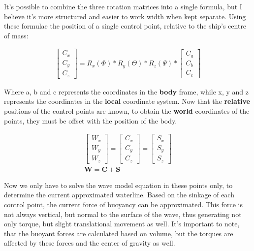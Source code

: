It's possible to combine the three rotation matrices into a single formula, but I believe it's more structured and easier to work width when kept separate. Using these formulae the position of a single control point, relative to the ship's centre of mass:

\begin{align}
	\begin{bmatrix}
		C_x \\
		C_y \\
		C_z
	\end{bmatrix}
	 = R_x(\Phi) * R_y(\Theta) * R_z(\Psi) *
	\begin{bmatrix}
		C_a \\
		C_b \\
		C_c
	\end{bmatrix}
\end{align}

Where a, b and c represents the coordinates in the \textbf{body} frame, while x, y and z represents the coordinates in the \textbf{local} coordinate system. Now that the \textbf{relative} positions of the control points are known, to obtain the \textbf{world} coordinates of the points, they must be offset with the position of the body.

\begin{align}
	\begin{bmatrix}
		W_x \\
		W_y \\
		W_z
	\end{bmatrix}
	=
	\begin{bmatrix}
		C_x \\
		C_y \\
		C_z
	\end{bmatrix}
	 =
	\begin{bmatrix}
		S_x \\
		S_y \\
		S_z
	\end{bmatrix}\\
	\textbf{W} = \textbf{C} + \textbf{S}
\end{align}

Now we only have to solve the wave model equation in these points only, to determine the current approximated waterline. Based on the sinkage of each control point, the current force of buoyancy can be approximated. This force is not always vertical, but normal to the surface of the wave, thus generating not only torque, but slight translational movement as well. It's important to note, that the buoyant forces are calculated based on volume, but the torques are affected by these forces and the center of gravity as well.

